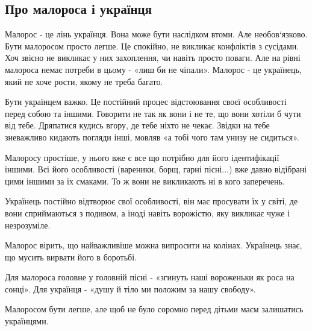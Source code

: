  
 
 
 
 

\subsection{Про малороса і українця}
\label{sec:10_04_2021.fb.vjatrovich_vladimir.1.maloros_ukrainec}

Малорос - це лінь українця. Вона може бути наслідком втоми. Але необов‘язково.
Бути малоросом просто легше. Це спокійно, не викликає конфліктів  з сусідами.
Хоч звісно не викликає у них захоплення, чи навіть просто поваги. Але на рівні
малороса немає потреби в цьому - «лиш би не чіпали». Малорос - це українець,
який не хоче рости, якому не треба багато.

Бути українцем важко. Це постійний процес відстоювання своєї особливості перед
собою та іншими. Говорити не так як вони і не те, що вони хотіли б чути від
тебе. Дряпатися кудись вгору, де тебе ніхто не чекає. Звідки на тебе зневажливо
кидають погляди інші, мовляв «а тобі чого там унизу не сидиться». 

Малоросу простіше, у нього вже є все що потрібно для його ідентифікації іншими.
Всі його особливості (вареники, борщ, гарні пісні...) вже давно відібрані  цими
іншими за їх смаками. То ж вони не викликають ні в кого заперечень. 

Українець постійно відтворює свої особливості, він має  просувати їх у світі,
де вони сприймаються з подивом, а іноді навіть ворожістю, яку викликає чуже і
незрозуміле. 

Малорос вірить, що найважливіше можна випросити на колінах. Українець знає, що
мусить вирвати його в боротьбі. 

Для малороса головне у головній пісні - «згинуть наші вороженьки як роса на
сонці». Для українця - «душу й тіло ми положим за нашу свободу». 

Малоросом бути легше,  але щоб не було соромно перед дітьми маєм залишатись
українцями. 
